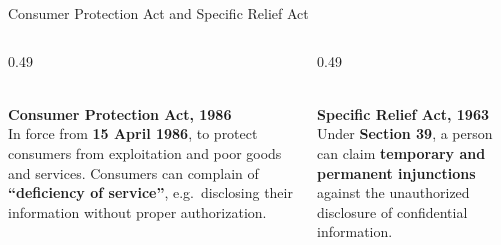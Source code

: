 \documentclass[aspectratio=169,11pt,xcolor={table}]{beamer}
\begin{document}
\begin{frame}{Consumer Protection Act and Specific Relief Act}
  \begin{columns}[T]
    \begin{column}{0.49\textwidth}
      \centering
      \\[1mm]
      \textbf{\textcolor{leaf!70!black}{Consumer Protection Act, 1986}}\\[1mm]
      {\small In force from \textbf{15 April 1986}, to protect consumers from exploitation and poor goods and services. Consumers can complain of \textbf{``deficiency of service''}, e.g.\ disclosing their information without proper authorization.}
    \end{column}
    \begin{column}{0.49\textwidth}
      \centering
      \\[1mm]
      \textbf{\textcolor{grape}{Specific Relief Act, 1963}}\\[1mm]
      {\small Under \textbf{Section 39}, a person can claim \textbf{temporary and permanent injunctions} against the unauthorized disclosure of confidential information.}
    \end{column}
  \end{columns}
\end{frame}
\end{document}

